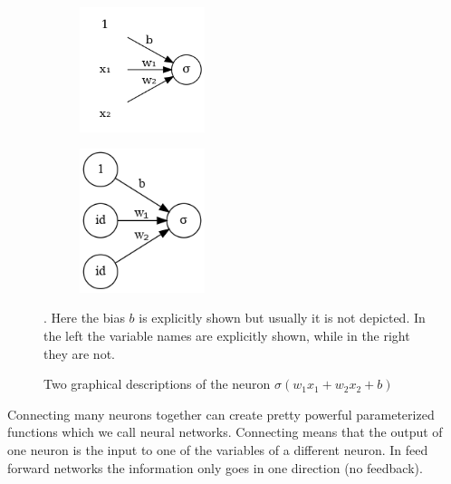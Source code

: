 \documentclass[11pt, a4paper]{report}
\theoremstyle{plain}
\theoremstyle{definition}
\theoremstyle{remark}
\begin{document}
\begin{figure}[!h]
\begin{framed}
\centering
\begin{subfigure}[b]{0.45\textwidth}
\includegraphics[width=0.4\textwidth]{./images/models/neuron.gv.png}
\end{subfigure}
\begin{subfigure}[b]{0.45\textwidth}
\includegraphics[width=0.4\textwidth]{./images/models/neuron.2.gv.png}
\end{subfigure}
\caption{Two graphical descriptions of the neuron
$\sigma(w_1x_1 + w_2x_2 + b)$}. Here the bias $b$ is explicitly shown
but usually it is not depicted. In the left the variable names are explicitly
shown, while in the right they are not.
\label{fig:neuron2}
\end{framed}
\end{figure}

Connecting many neurons together can create pretty powerful parameterized
functions which we call neural networks.
Connecting means that the output of one neuron is the input to one of the
variables of a different neuron.
In feed forward networks the information only goes in one direction (no
feedback).
\end{document}
